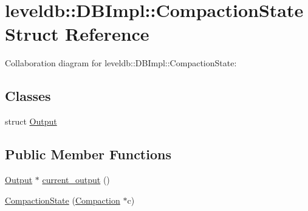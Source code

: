 \hypertarget{structleveldb_1_1_d_b_impl_1_1_compaction_state}{}\section{leveldb\+:\+:D\+B\+Impl\+:\+:Compaction\+State Struct Reference}
\label{structleveldb_1_1_d_b_impl_1_1_compaction_state}


Collaboration diagram for leveldb\+:\+:D\+B\+Impl\+:\+:Compaction\+State\+:
\subsection*{Classes}
\begin{DoxyCompactItemize}
\item 
struct \hyperlink{structleveldb_1_1_d_b_impl_1_1_compaction_state_1_1_output}{Output}
\end{DoxyCompactItemize}
\subsection*{Public Member Functions}
\begin{DoxyCompactItemize}
\item 
\hyperlink{structleveldb_1_1_d_b_impl_1_1_compaction_state_1_1_output}{Output} $\ast$ \hyperlink{structleveldb_1_1_d_b_impl_1_1_compaction_state_ac371d4a1422f4c1c122cfd39e97a6b95}{current\+\_\+output} ()
\item 
\hyperlink{structleveldb_1_1_d_b_impl_1_1_compaction_state_a3f66a31afd7f73ef5021337d1ec626b6}{Compaction\+State} (\hyperlink{classleveldb_1_1_compaction}{Compaction} $\ast$c)
\end{DoxyCompactItemize}
